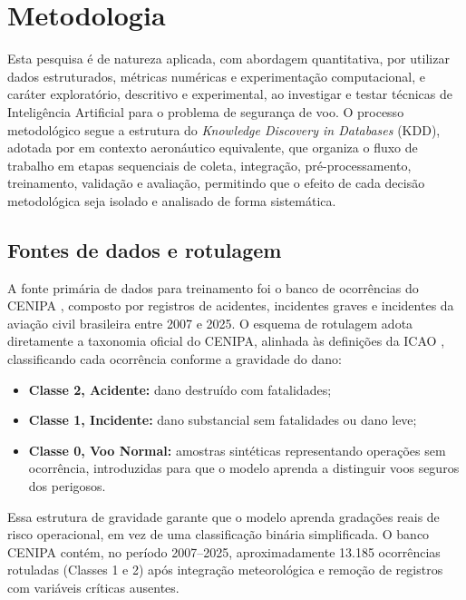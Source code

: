 \documentclass[english,brazilian]{UNISINOSartigo}
\begin{document}
\section{Metodologia}

Esta pesquisa é de natureza aplicada, com abordagem quantitativa, por utilizar
dados estruturados, métricas numéricas e experimentação computacional, e
caráter exploratório, descritivo e experimental, ao investigar e testar técnicas
de Inteligência Artificial para o problema de segurança de voo. O processo
metodológico segue a estrutura do \textit{Knowledge Discovery in Databases}
(KDD), adotada por  em contexto aeronáutico equivalente,
que organiza o fluxo de trabalho em etapas sequenciais de coleta, integração,
pré-processamento, treinamento, validação e avaliação, permitindo que o efeito
de cada decisão metodológica seja isolado e analisado de forma sistemática.

\subsection{Fontes de dados e rotulagem}

A fonte primária de dados para treinamento foi o banco de ocorrências do CENIPA
\cite{CENIPA2025}, composto por registros de acidentes, incidentes graves e
incidentes da aviação civil brasileira entre 2007 e 2025. O esquema de
rotulagem adota diretamente a taxonomia oficial do CENIPA, alinhada às
definições da ICAO \cite{ICAO2018}, classificando cada ocorrência conforme a
gravidade do dano:

\begin{itemize}
  \item \textbf{Classe 2, Acidente:} dano destruído com fatalidades;
  \item \textbf{Classe 1, Incidente:} dano substancial sem fatalidades ou dano leve;
  \item \textbf{Classe 0, Voo Normal:} amostras sintéticas representando operações sem
  ocorrência, introduzidas para que o modelo aprenda a distinguir voos seguros dos perigosos.
\end{itemize}

Essa estrutura de gravidade garante que o modelo aprenda gradações reais de risco
operacional, em vez de uma classificação binária simplificada. O banco CENIPA contém, no período 2007--2025,
aproximadamente 13.185 ocorrências rotuladas (Classes 1 e 2) após integração
meteorológica e remoção de registros com variáveis críticas ausentes.
\end{document}
